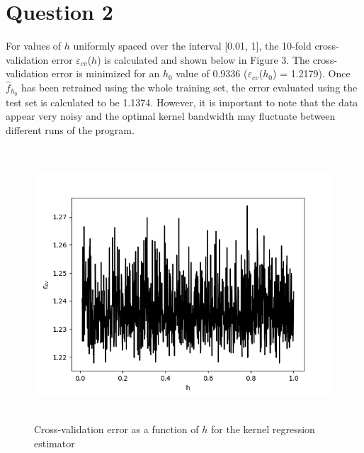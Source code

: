 \section*{Question 2}
For values of $h$ uniformly spaced over the interval [0.01, 1], the 10-fold cross-validation error $\varepsilon_{cv}$($h$) is calculated and shown below in Figure 3. The cross-validation error is minimized for an $h_{0}$ value of 0.9336 ($\varepsilon_{cv}$($h_{0}$) = 1.2179). Once $\hat{f}_{h_{0}}$ has been retrained using the whole training set, the error evaluated using the test set is calculated to be 1.1374. However, it is important to note that the data appear very noisy and the optimal kernel bandwidth may fluctuate between different runs of the program.
\begin{figure}[h!]
    \centering
    \includegraphics[height=4in]{Figure_9.png}
    \caption{Cross-validation error as a function of $h$ for the kernel regression estimator}
\end{figure}